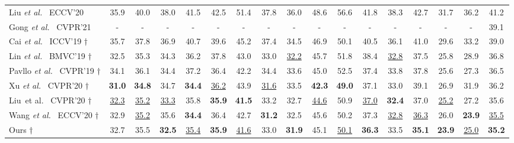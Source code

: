 \documentclass[journal]{IEEEtran}
\begin{document}
\begin{table*}[t]
{\begin{tabular}{@{}l|ccccccccccccccc|c@{}}
Liu \emph{et al.}~\cite{liu2020comprehensive} ECCV'20  &35.9 &40.0 &38.0 &41.5 &42.5 &51.4 &37.8 &36.0 &48.6 &56.6 &41.8 &38.3 &42.7 &31.7 &36.2 &41.2 \\

Gong \emph{et al.}~\cite{gong2021poseaug} CVPR'21  &- &- &- &- &- &- &- &- &- &- &- &- &- &- &-  &39.1 \\

Cai \emph{et al.}~\cite{cai2019exploiting} ICCV'19  $\dag$ &35.7 &37.8 &36.9 &40.7 &39.6 &45.2 &37.4 &34.5 &46.9 &50.1 &40.5 &36.1 &41.0 &29.6 &33.2 &39.0 \\

Lin \emph{et al.}~\cite{lin2019trajectory} BMVC'19  $\dag$ &32.5 &35.3 &34.3 &36.2 &37.8 &43.0 &33.0 &\underline{32.2} &45.7 &51.8 &38.4 &\underline{32.8} &37.5 &25.8 &28.9 &36.8 \\

Pavllo \emph{et al.}~\cite{pavllo20193d} CVPR'19 $\dag$ &34.1 &36.1 &{34.4} &37.2 &{36.4} &42.2 &34.4 &33.6 &45.0 &52.5 &37.4 &33.8 &37.8 &25.6 &27.3 &36.5\\

Xu \emph{et al.}~\cite{xu2020deep} CVPR'20 $\dag$ &\textbf{31.0} &\textbf{34.8} &34.7 &\textbf{34.4} &\underline{36.2} &43.9 &\underline{31.6} &33.5 &\textbf{42.3} &\textbf{49.0} &37.1 &33.0 &39.1 &26.9 &31.9 &36.2 \\

Liu~et al.~\cite{liu2020attention} CVPR'20 $\dag$ &\underline{32.3} &\underline{35.2} &\underline{33.3} &35.8 &\textbf{35.9} &\textbf{41.5} &33.2 &{32.7} &\underline{44.6} &50.9 &\underline{37.0} &\textbf{32.4} &37.0 &\underline{25.2} &27.2 &35.6 \\

Wang \emph{et al.}~\cite{wang2020motion} ECCV'20 $\dag$  &32.9 &\underline{35.2} &35.6 &\textbf{34.4} &36.4 &42.7 &\textbf{31.2} &{32.5} &45.6 &50.2 &37.3 &\underline{32.8} &\underline{36.3} &26.0 &\textbf{23.9} &\underline{35.5} \\

      \midrule[0.5pt]

      Ours $\dag$ &{32.7} &{35.5} &\textbf{32.5} &\underline{35.4} &\textbf{35.9} &\underline{41.6} &{33.0} &\textbf{31.9} &{45.1} &\underline{50.1} &\textbf{36.3} &{33.5} &\textbf{35.1} &\textbf{23.9} &\underline{25.0}  &\textbf{35.2} \\

      \toprule[1pt]
      \end{tabular}
   }
   \label{table:h36m}
\end{table*}
\end{document}
